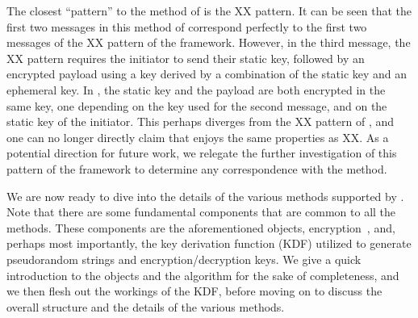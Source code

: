 {The closest \mNoise{} ``pattern'' to the \mStatStat{} method of \mEdhoc{} is the
XX pattern. It can be seen that the first two messages in this method of
\mEdhoc{} correspond perfectly to the first two messages of the XX pattern of
the \mNoise{} framework. However, in the third message, the XX pattern requires
the initiator to send their static key, followed by an encrypted payload using a
key derived by a combination of the static key and an ephemeral key. In
\mEdhoc{}, the static key and the payload are both encrypted in the same key, one depending on the key used for the second message, and on the static key of the initiator.
This perhaps diverges from the XX pattern of \mNoise{}, and one can no longer
directly claim that \mEdhoc{} enjoys the same properties as XX. As a potential
direction for future work, we relegate the further investigation of this pattern
of the \mNoise{} framework to {determine any} correspondence with the
\mStatStat{} method.

We are now ready to dive into the details of the various methods supported by
\mEdhoc. Note that there are some fundamental components that are common to all
the \mEdhoc methods. These components are the aforementioned \mCose{} objects,
\mAead{} encryption~\cite{aead}, and, perhaps most importantly, the key
derivation function (KDF) utilized to generate pseudorandom strings and
encryption/decryption keys. We give a quick introduction to the \mCose{} objects and the \mAead{} algorithm for the sake of completeness, and we then flesh out the workings of the KDF, before moving on to discuss the {overall structure and the details of the various} methods.

}
